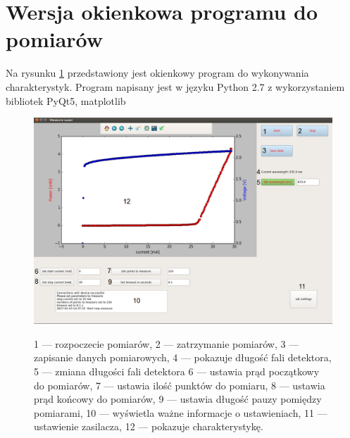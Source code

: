 \section{Wersja okienkowa programu do pomiarów}
Na rysunku \ref{gui_rys} przedstawiony jest okienkowy program do wykonywania charakterystyk. Program napisany jest w języku
Python 2.7 z wykorzystaniem bibliotek PyQt5, matplotlib
\begin{figure}[h]
\center
  \includegraphics[scale=0.35]{gui.eps}
  \label{gui_rys}
  \caption{1 --- rozpoczecie pomiarów, 2 --- zatrzymanie pomiarów, 3 --- zapisanie danych pomiarowych, 4 --- pokazuje długość fali detektora,
   5 --- zmiana długości fali detektora 6 --- ustawia prąd początkowy do pomiarów, 7 ---  ustawia ilość punktów do pomiaru,
   8 --- ustawia prąd końcowy do pomiarów, 9 --- ustawia długość pauzy pomiędzy pomiarami, 10 --- wyświetla ważne informacje o ustawieniach,
   11 --- ustawienie zasilacza, 12 --- pokazuje charakterystykę.}
\end{figure}
\newpage
